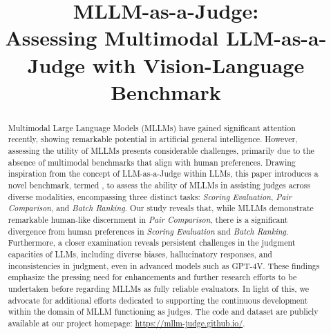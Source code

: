 \title{MLLM-as-a-Judge:\\ Assessing Multimodal LLM-as-a-Judge with Vision-Language Benchmark}




\printAffiliationsAndNotice{\icmlEqualContribution} %

\begin{abstract}
Multimodal Large Language Models (MLLMs) have gained significant attention recently, showing remarkable potential in artificial general intelligence.
However, assessing the utility of MLLMs presents considerable challenges, primarily due to the absence of multimodal benchmarks that align with human preferences.
Drawing inspiration from the concept of LLM-as-a-Judge within LLMs, this paper introduces a novel benchmark, termed , to assess the ability of MLLMs in assisting judges across diverse modalities, encompassing three distinct tasks: \textit{Scoring Evaluation}, \textit{Pair Comparison}, and \textit{Batch Ranking}.
Our study reveals that, while MLLMs demonstrate remarkable human-like discernment in \textit{Pair Comparison}, there is a significant divergence from human preferences in \textit{Scoring Evaluation} and \textit{Batch Ranking}.
Furthermore, a closer examination reveals persistent challenges in the judgment capacities of LLMs, including diverse biases, hallucinatory responses, and inconsistencies in judgment, even in advanced models such as GPT-4V.
These findings emphasize the pressing need for enhancements and further research efforts to be undertaken before regarding MLLMs as fully reliable evaluators. 
In light of this, we advocate for additional efforts dedicated to supporting the continuous development within the domain of MLLM functioning as judges. The code and dataset are publicly available at our project homepage: \url{https://mllm-judge.github.io/}.

\end{abstract}
